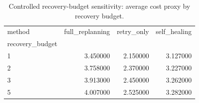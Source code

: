 \begin{table}
\caption{Controlled recovery-budget sensitivity: average cost proxy by recovery budget.}
\label{tab:controlled_budget_cost}
\begin{tabular}{lrrr}
\toprule
method & full_replanning & retry_only & self_healing \\
recovery_budget &  &  &  \\
\midrule
1 & 3.450000 & 2.150000 & 3.127000 \\
2 & 3.758000 & 2.370000 & 3.227000 \\
3 & 3.913000 & 2.450000 & 3.262000 \\
5 & 4.007000 & 2.525000 & 3.282000 \\
\bottomrule
\end{tabular}
\end{table}
